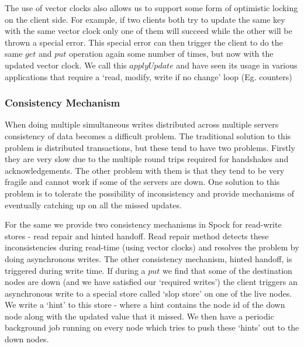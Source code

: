 \documentclass[twocolumn]{article}
\newcommand{\projectname}{Spock}
\begin{document}
The use of vector clocks also allows us to support some form of optimistic locking on the client side. For example, if two clients both try to update the same key with the same vector clock only one of them will succeed while the other will be thrown a special error. This special error can then trigger the client to do the same $get$ and $put$ operation again some number of times, but now with the updated vector clock. We call this $applyUpdate$ and have seen its usage in various applications that require a `read, modify, write if no change' loop (Eg. counters)


\subsubsection {Consistency Mechanism }
\label{sec:system_architecture:system_components:consistency_mechanism}

When doing multiple simultaneous writes distributed across multiple servers consistency of data becomes a difficult problem. The traditional solution to this problem is distributed transactions, but these tend to have two problems. Firstly they are very slow due to the multiple round trips required for handshakes and acknowledgements. The other problem with them is that they tend to be very fragile and cannot work if some of the servers are down. One solution to this problem is to tolerate the possibility of inconsistency and provide mechanisms of eventually catching up on all the missed updates. 

For the same we provide two consistency mechanisms in \projectname{} for read-write stores - read repair and hinted handoff. Read repair method detects these inconsistencies during read-time (using vector clocks) and resolves the problem by doing asynchronous writes. The other consistency mechanism, hinted handoff, is triggered during write time. If during a $put$ we find that some of the destination nodes are down (and we have satisfied our `required writes') the client triggers an asynchronous write to a special store called `slop store' on one of the live nodes. We write a `hint' to this store - where a hint contains the node id of the down node along with the updated value that it missed. We then have a periodic background job running on every node which tries to push these `hints' out to the down nodes.
\end{document}
